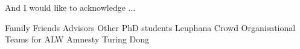 
\begin{acknowledgements}      

And I would like to acknowledge ...

Family
Friends
Advisors
Other PhD students
Leuphana Crowd
Organisational Teams for ALW
Amnesty
Turing
Dong

\end{acknowledgements}
